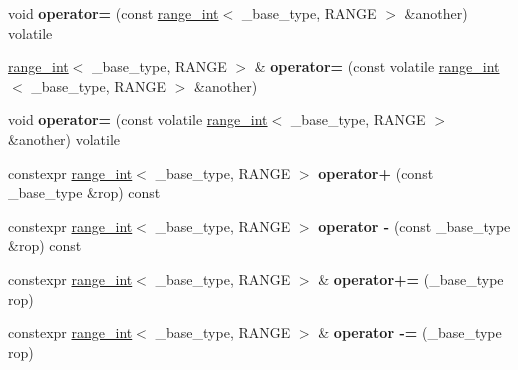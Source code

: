 \begin{DoxyCompactItemize}
\item 
\mbox{\label{classfsl_1_1lg_1_1range__int_a12cbcfc3989c4a4211e5ee9e4f6dc057}} 
void {\bfseries operator=} (const \mbox{\hyperlink{classfsl_1_1lg_1_1range__int}{range\+\_\+int}}$<$ \+\_\+base\+\_\+type, R\+A\+N\+GE $>$ \&another) volatile
\item 
\mbox{\label{classfsl_1_1lg_1_1range__int_ad68b8d722621d6e1eb0f18e86abf67b4}} 
\mbox{\hyperlink{classfsl_1_1lg_1_1range__int}{range\+\_\+int}}$<$ \+\_\+base\+\_\+type, R\+A\+N\+GE $>$ \& {\bfseries operator=} (const volatile \mbox{\hyperlink{classfsl_1_1lg_1_1range__int}{range\+\_\+int}}$<$ \+\_\+base\+\_\+type, R\+A\+N\+GE $>$ \&another)
\item 
\mbox{\label{classfsl_1_1lg_1_1range__int_aae783349cffc3aaa08c0ce9cc38e60a4}} 
void {\bfseries operator=} (const volatile \mbox{\hyperlink{classfsl_1_1lg_1_1range__int}{range\+\_\+int}}$<$ \+\_\+base\+\_\+type, R\+A\+N\+GE $>$ \&another) volatile
\item 
\mbox{\label{classfsl_1_1lg_1_1range__int_ae36516b64216806a57986fcedaa07d63}} 
constexpr \mbox{\hyperlink{classfsl_1_1lg_1_1range__int}{range\+\_\+int}}$<$ \+\_\+base\+\_\+type, R\+A\+N\+GE $>$ {\bfseries operator+} (const \+\_\+base\+\_\+type \&rop) const
\item 
\mbox{\label{classfsl_1_1lg_1_1range__int_a0cc2becff969f7e51756aa0b1ed478a6}} 
constexpr \mbox{\hyperlink{classfsl_1_1lg_1_1range__int}{range\+\_\+int}}$<$ \+\_\+base\+\_\+type, R\+A\+N\+GE $>$ {\bfseries operator -\/} (const \+\_\+base\+\_\+type \&rop) const
\item 
\mbox{\label{classfsl_1_1lg_1_1range__int_a51d28cd6ba3a29a2d71732f550f4a826}} 
constexpr \mbox{\hyperlink{classfsl_1_1lg_1_1range__int}{range\+\_\+int}}$<$ \+\_\+base\+\_\+type, R\+A\+N\+GE $>$ \& {\bfseries operator+=} (\+\_\+base\+\_\+type rop)
\item 
\mbox{\label{classfsl_1_1lg_1_1range__int_a4866f6b3620c8058fe5c2b5f2dbff6b9}} 
constexpr \mbox{\hyperlink{classfsl_1_1lg_1_1range__int}{range\+\_\+int}}$<$ \+\_\+base\+\_\+type, R\+A\+N\+GE $>$ \& {\bfseries operator -\/=} (\+\_\+base\+\_\+type rop)

\end{DoxyCompactItemize}

